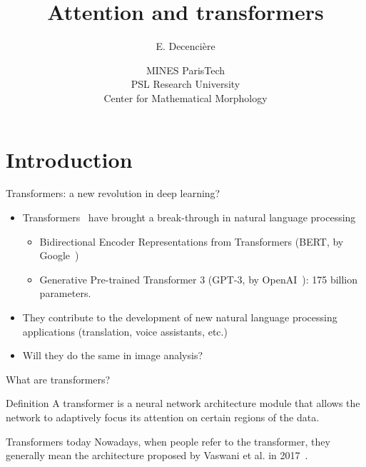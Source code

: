 \documentclass[xcolor=pdftex,dvipsnames,table,mathserif]{beamer}
\title{Attention and transformers}
\author{E. Decencière}
\date{MINES ParisTech\\
  PSL Research University\\
  Center for Mathematical Morphology
}
\begin{document}
\frame{\titlepage}


\section{Introduction}


\begin{frame}{Transformers: a new revolution in deep learning?}

\begin{itemize}
\item Transformers~\cite{vaswani_attention_2017} have brought a break-through in natural language processing
  \begin{itemize}
  \item Bidirectional Encoder Representations from Transformers (BERT, by Google~\cite{brown_language_2020})
  \item Generative Pre-trained Transformer 3 (GPT-3, by OpenAI~\cite{devlin_bert_2019}): 175 billion parameters.
  \end{itemize}
  \item They contribute to the development of new natural language processing applications (translation, voice assistants, etc.)
  \item Will they do the same in image analysis?
\end{itemize}

\end{frame}


\begin{frame}{What are transformers?}

\begin{block}{Definition}
A transformer is a neural network architecture module that allows the network to \alert{adaptively focus its attention} on certain regions of the data.
\end{block}

\pause

\begin{alertblock}{Transformers today}
  Nowadays, when people refer to the transformer, they generally mean the architecture proposed by Vaswani et al. in 2017~\cite{vaswani_attention_2017}.
\end{alertblock}

\end{frame}
\end{document}
